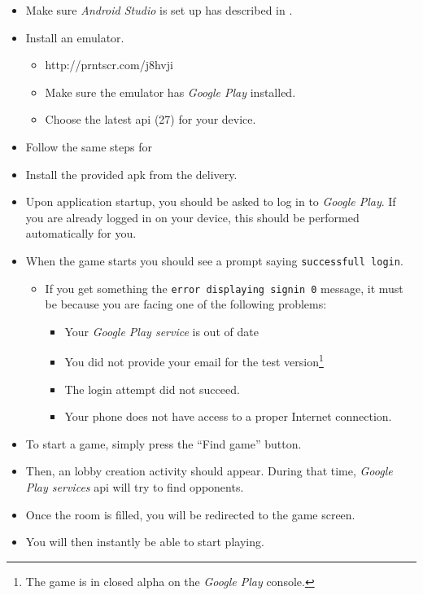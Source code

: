 \begin{itemize}
	\item Make sure \textit{Android Studio} is set up has described in .
	\item Install an emulator.
	\begin{itemize}
		\item http://prntscr.com/j8hvji
		\item Make sure the emulator has \textit{Google Play} installed.
		\item Choose the latest \gls{api} (27) for your device.
  \end{itemize}
  \item Follow the same steps for 
\end{itemize}

\begin{itemize}
	\item Install the provided \gls{apk} from the delivery.
	\item Upon application startup, you should be asked to log in to \textit{Google Play}. If you are already logged in on your device, this should be performed automatically for you.
	\item When the game starts you should see a prompt saying \texttt{successfull login}.
	\begin{itemize}
		\item If you get something the \texttt{error displaying signin 0} message, it must be because you are facing one of the following problems:
    \begin{itemize}
      \item Your \textit{Google Play service} is out of date
      \item You did not provide your email for the test version\footnote{The game is in closed alpha on the \textit{Google Play} console.}
      \item The login attempt did not succeed. \item Your phone does not have access to a proper Internet connection.
    \end{itemize}
	\end{itemize}
\end{itemize}

\begin{itemize}
	\item To start a game, simply press the “Find game” button.
  \item Then, an lobby creation activity should appear. During that time, \textit{Google Play services} \gls{api} will try to find opponents.
  \item Once the room is filled, you will be redirected to the game screen.
	\item You will then instantly be able to start playing.
\end{itemize}

